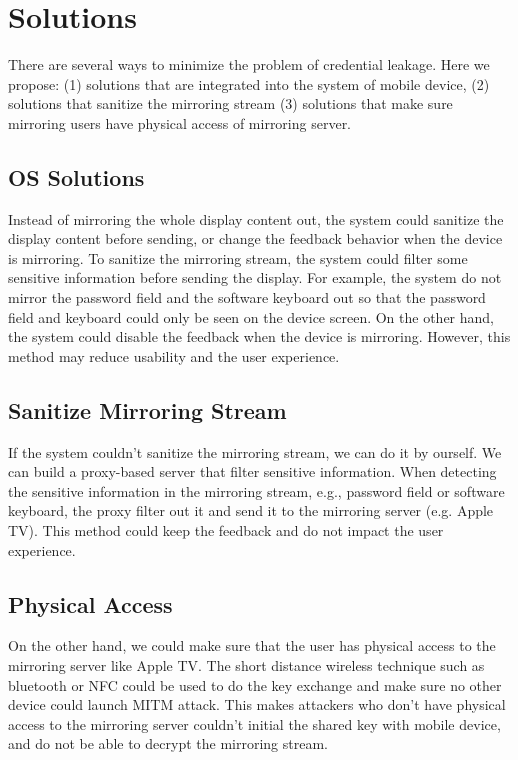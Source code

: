 \chapter{Solutions}

There are several ways to minimize the problem of credential leakage. Here we propose: (1) solutions that are integrated into the system of mobile device, (2) solutions that sanitize the mirroring stream (3) solutions that make sure mirroring users have physical access of mirroring server.

\section{OS Solutions}

Instead of mirroring the whole display content out, the system could sanitize the display content before sending, or change the feedback behavior when the device is mirroring. To sanitize the mirroring stream, the system could filter some sensitive information before sending the display. For example, the system do not mirror the password field and the software keyboard out so that the password field and keyboard could only be seen on the device screen. On the other hand, the system could disable the feedback when the device is mirroring. However, this method may reduce usability and the user experience.

\section{Sanitize Mirroring Stream}

If the system couldn't sanitize the mirroring stream, we can do it by ourself. We can build a proxy-based server that filter sensitive information. When detecting the sensitive information in the mirroring stream, e.g., password field or software keyboard, the proxy filter out it and send it to the mirroring server (e.g. Apple TV). This method could keep the feedback and do not impact the user experience.

\section{Physical Access}

On the other hand, we could make sure that the user has physical access to the mirroring server like Apple TV. The short distance wireless technique such as bluetooth or NFC could be used to do the key exchange and make sure no other device could launch MITM attack. This makes attackers who don't have physical access to the mirroring server couldn't initial the shared key with mobile device, and do not be able to decrypt the mirroring stream.
